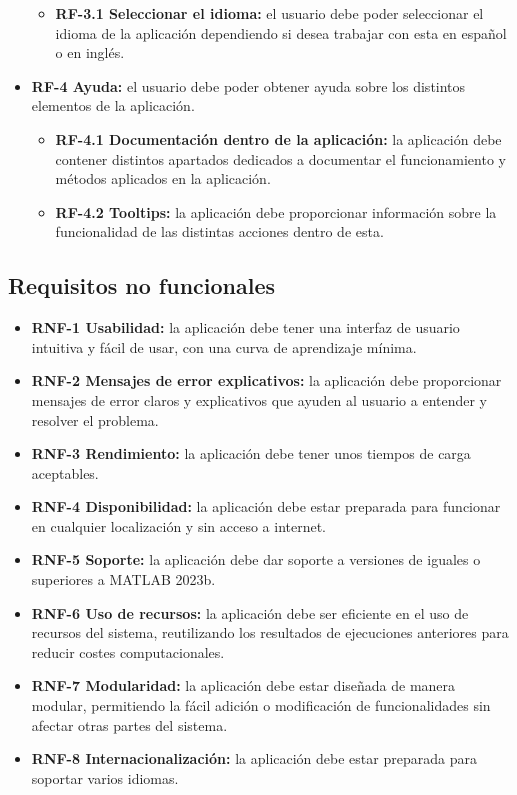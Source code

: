 \begin{itemize}
\begin{itemize}
        \item \textbf{RF-3.1 Seleccionar el idioma:} el usuario debe poder seleccionar el idioma de la aplicación dependiendo si desea trabajar con esta en español o en inglés. 
    \end{itemize}
    \item \textbf{RF-4 Ayuda:} el usuario debe poder obtener ayuda sobre los distintos elementos de la aplicación.
    \begin{itemize}
        \item \textbf{RF-4.1 Documentación dentro de la aplicación:} la aplicación debe contener distintos apartados dedicados a documentar el funcionamiento y métodos aplicados en la aplicación. 
        \item \textbf{RF-4.2 Tooltips:} la aplicación debe proporcionar información sobre la funcionalidad de las distintas acciones dentro de esta.
    \end{itemize}
\end{itemize}

\subsection{Requisitos no funcionales}\label{requisitos-no-funcionales}

\begin{itemize}
    \item \textbf{RNF-1 Usabilidad:} la aplicación debe tener una interfaz de usuario intuitiva y fácil de usar, con una curva de aprendizaje mínima.
    \item \textbf{RNF-2 Mensajes de error explicativos:} la aplicación debe proporcionar mensajes de error claros y explicativos que ayuden al usuario a entender y resolver el problema.
    \item \textbf{RNF-3 Rendimiento:} la aplicación debe tener unos tiempos de carga aceptables.
    \item \textbf{RNF-4 Disponibilidad:} la aplicación debe estar preparada para funcionar en cualquier localización y sin acceso a internet.
    \item \textbf{RNF-5 Soporte:} la aplicación debe dar soporte a versiones de iguales o superiores a MATLAB 2023b.
    \item \textbf{RNF-6 Uso de recursos:} la aplicación debe ser eficiente en el uso de recursos del sistema, reutilizando los resultados de ejecuciones anteriores para reducir costes computacionales.
    \item \textbf{RNF-7 Modularidad:} la aplicación debe estar diseñada de manera modular, permitiendo la fácil adición o modificación de funcionalidades sin afectar otras partes del sistema.
    \item \textbf{RNF-8 Internacionalización:} la aplicación debe estar preparada para soportar varios idiomas.
\end{itemize}

